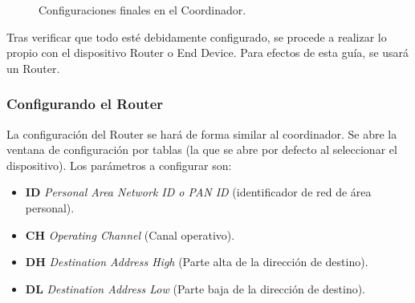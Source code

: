 \begin{figure}[H] %
\caption[1]{Configuraciones finales en el Coordinador.}
\label{fig:CoordAll}
\end{figure}

Tras verificar que todo esté debidamente configurado, se procede a realizar lo propio con el dispositivo Router o End Device. Para efectos de esta guía, se usará un Router.

\subsubsection{Configurando el Router}
La configuración del Router se hará de forma similar al coordinador. Se abre la ventana de configuración por tablas (la que se abre por defecto al seleccionar el dispositivo). Los parámetros a configurar son:

\begin{itemize}
	\item \textbf{ID} \textit{Personal Area Network ID o PAN ID} (identificador de red de área personal). 
	\item \textbf{CH} \textit{Operating Channel} (Canal operativo).
	\item \textbf{DH} \textit{Destination Address High} (Parte alta de la dirección de destino).
	\item \textbf{DL} \textit{Destination Address Low} (Parte baja de la dirección de destino).
\end{itemize}

